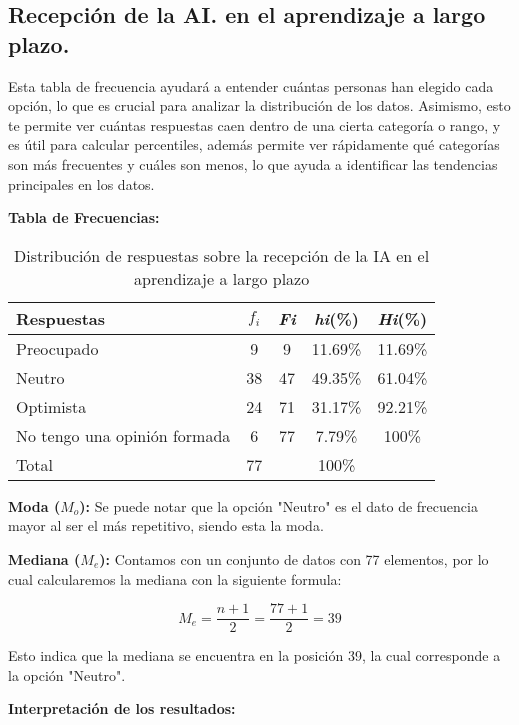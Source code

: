 \subsection{Recepción de la AI. en el aprendizaje a largo plazo.}

Esta tabla de frecuencia ayudará a entender cuántas personas han elegido cada opción, lo que es 
crucial para analizar la distribución de los datos. Asimismo, esto te permite ver cuántas respuestas 
caen dentro de una cierta categoría o rango, y es útil para calcular percentiles, además permite ver 
rápidamente qué categorías son más frecuentes y cuáles son menos, lo que ayuda a identificar las 
tendencias principales en los datos.

\textbf{Tabla de Frecuencias:}

\begin{table}[H]
  \centering
  \renewcommand{\arraystretch}{1.2}
  \begin{tabular}{l c c c c}
    \hline
    {Respuestas} & {\(f_i\)} & \textit{Fi} & \textit{hi}(\%) & \textit{Hi}(\%)\\
    \hline
    Preocupado  & 9  & 9  & 11.69\% & 11.69\%\\
    Neutro      & 38 & 47 & 49.35\% & 61.04\%\\
    Optimista   & 24 & 71 & 31.17\% & 92.21\%\\
    No tengo una opinión formada & 6  & 77 & 7.79\%  & 100\%\\
    \hline
    Total       & 77 &    & 100\%   & \\
    \hline
  \end{tabular}
  \caption{Distribución de respuestas sobre la recepción de la IA en el aprendizaje a largo plazo}
  \label{tabla:recepcionIA}
\end{table}

\textbf{Moda ($M_o$):} Se puede notar que la opción "Neutro" es el dato de frecuencia mayor al ser el más 
repetitivo, siendo esta la moda.

\textbf{Mediana ($M_e$):}  Contamos con un conjunto de datos con 77 elementos, por lo cual calcularemos la 
mediana con la siguiente formula:

\begin{equation*}
  M_e = \dfrac{n + 1}{2} = \dfrac{77 + 1}{2} = 39
\end{equation*}

Esto indica que la mediana se encuentra en la posición 39, la cual corresponde a la opción "Neutro".

\textbf{Interpretación de los resultados:}

